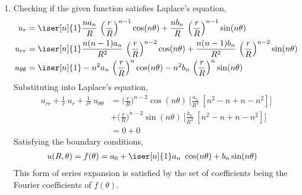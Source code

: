 \begin{enumerate}
\begin{enumerate}
              \item Checking if the given function satisfies Laplace's equation,
                    \begin{align}
                        u_r              & = \iser[n]{1} \frac{na_n}{R}
                        \ \Big( \frac{r}{R} \Big)^{n-1} \cos(n\theta)
                        + \frac{nb_n}{R}\ \Big( \frac{r}{R} \Big)^{n-1} \sin(n\theta) \\
                        u_{rr}           & = \iser[n]{1} \frac{n(n-1)a_n}{R^2}
                        \ \Big( \frac{r}{R} \Big)^{n-2} \cos(n\theta)
                        + \frac{n(n-1)b_n}{R^2}
                        \ \Big( \frac{r}{R} \Big)^{n-2} \sin(n\theta)                 \\
                        u_{\theta\theta} & = \iser[n]{1} -n^2a_n
                        \ \Big( \frac{r}{R} \Big)^{n} \cos(n\theta)
                        - n^2b_n\ \Big( \frac{r}{R} \Big)^{n} \sin(n\theta)
                    \end{align}
                    Substituting into Laplace's equation,
                    \begin{align}
                        u_{rr} + \frac{1}{r}\ u_r + \frac{1}{r^2}\ u_{\theta\theta}
                         & = \Big( \frac{r}{R} \Big)^{n-2} \cos(n\theta)\ \Bigg[
                        \frac{a_n}{R^2}\ [n^2 - n + n - n^2]\Bigg]               \\
                         & + \Big( \frac{r}{R} \Big)^{n-2} \sin(n\theta)\ \Bigg[
                        \frac{b_n}{R^2}\ [n^2 - n + n - n^2]\Bigg]               \\
                         & = 0 + 0
                    \end{align}
                    Satisfying the boundary conditions,
                    \begin{align}
                        u(R, \theta) & = f(\theta) = a_0 + \iser[n]{1} a_n\ \cos(n\theta)
                        + b_n \sin(n\theta)
                    \end{align}
                    This form of series expansion is satisfied by the set of coefficients
                    being the Fourier coefficients of $ f(\theta) $.


\end{enumerate}
\end{enumerate}

